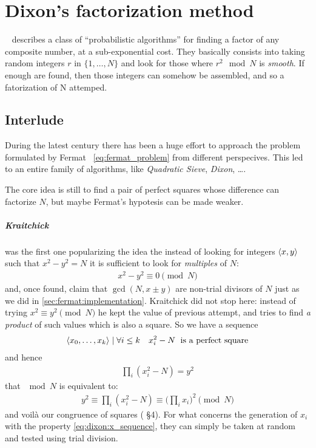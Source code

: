 \chapter{Dixon's factorization method\label{chap:dixon}}

~\cite{dixon} describes a class of ``probabilistic algorithms'' for finding a
factor of any composite number, at a sub-exponential cost. They basically
consists into taking random integers $r$ in $\{1, \ldots, N\}$ and look for those
where $r^2 \mod{N}$ is \emph{smooth}. If enough are found, then those integers
can somehow be assembled, and so a fatorization of N attemped.

\section{Interlude \label{sec:dixon:history}}
During the latest century there has been a huge effort to approach the problem
formulated by Fermat ~\ref{eq:fermat_problem} from different perspecives. This
led to an entire family of algorithms, like \emph{Quadratic Sieve},
\emph{Dixon}, \ldots.

The core idea is still to find a pair of perfect squares whose difference can
factorize $N$, but maybe Fermat's hypotesis can be made weaker.

\paragraph{Kraitchick} was the first one popularizing the idea the instead of
looking for integers $\langle x, y\rangle$ such that $x^2 -y^2 = N$ it is sufficient
to look for \emph{multiples} of $N$:
\begin{align}
  x^2 - y^2 \equiv 0 \pmod{N}
\end{align}
and, once found, claim that $\gcd(N, x \pm y)$ are non-trial divisors of $N$
just as we did in \ref{sec:fermat:implementation}.
Kraitchick did not stop here: instead of trying $x^2 \equiv y^2 \pmod{N}$ he
kept the value of previous attempt, and tries to find \emph{a product} of such
values which is also a square. So we have a sequence
\begin{align}
  \label{eq:dixon:x_sequence}
  \langle x_0, \ldots, x_k\rangle \mid \forall i \leq k \quad x_i^2 - N
  \; \text{ is a perfect square}
\end{align}
and hence
\begin{align*}
  \prod_i (x_i^2 - N) = y^2
\end{align*}
that $\mod{N}$ is equivalent to:
\begin{align}
  \label{eq:dixon:fermat_revisited}
  y^2 \equiv \prod_i (x_i^2 - N) \equiv \big( \prod_i x_i \big) ^2 \pmod{N}
\end{align}
and voil\`a our congruence of squares (\cite{discretelogs} \S 4). For what
concerns the generation of $x_i$ with the property \ref{eq:dixon:x_sequence},
they can simply be taken at random and tested using trial division.

